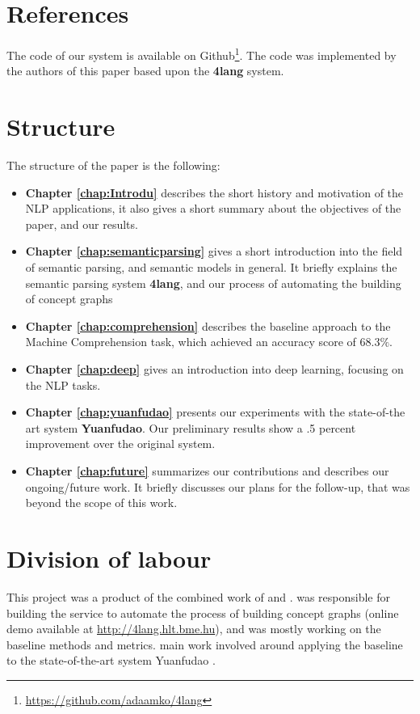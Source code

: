 \section{References}
The code of our system is available on Github\footnote{\url{https://github.com/adaamko/4lang}}. The code was implemented by the authors of this paper based upon the \textbf{4lang} system.

\section{Structure}
The structure of the paper is the following:
\begin{itemize}
	\item \textbf{Chapter \ref{chap:Introdu}} describes the short history and motivation of the NLP applications, it also gives a short summary about the objectives of the paper, and our results.
	\item \textbf{Chapter \ref{chap:semanticparsing}} gives a short introduction into the field of semantic parsing, and semantic models in general. It briefly explains the semantic parsing system \textbf{4lang}, and our process of automating the building of concept graphs
	\item \textbf{Chapter \ref{chap:comprehension}} describes the baseline approach to the Machine Comprehension task, which achieved an accuracy score of $68.3\%$.
	\item \textbf{Chapter \ref{chap:deep}} gives an introduction into deep learning, focusing on the NLP tasks.
	\item \textbf{Chapter \ref{chap:yuanfudao}} presents our experiments with the state-of-the art system \textbf{Yuanfudao}. Our preliminary results show a .5 percent improvement over the original system.
	\item \textbf{Chapter \ref{chap:future}} summarizes our contributions and describes our ongoing/future work. It briefly discusses our plans for the follow-up, that was beyond the scope of this work.
\end{itemize}

\section{Division of labour}
This project was a product of the combined work of \vikszerzo and \vikszerzos. \vikszerzo was responsible for building the service to automate the process of building concept graphs (online demo available at \url{http://4lang.hlt.bme.hu}), and was mostly working on the baseline methods and metrics. \vikszerzos main work involved around applying the baseline to the state-of-the-art system Yuanfudao \cite{Wang:2018}.